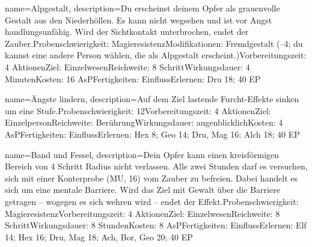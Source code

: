 {
    name={Alpgestalt},
    description={Du erscheinst deinem Opfer als grauenvolle Gestalt aus den Niederhöllen. Es kann nicht wegsehen und ist vor Angst handlungsunfähig. Wird der Sichtkontakt unterbrochen, endet der Zauber.\newline Probenschwierigkeit: Magieresistenz\newline Modifikationen: Fremdgestalt (–4; du kannst eine andere Person wählen, die als Alpgestalt erscheint.)\newline Vorbereitungszeit: 4 Aktionen\newline Ziel: Einzelwesen\newline Reichweite: 8 Schritt\newline Wirkungsdauer: 4 Minuten\newline Kosten: 16 AsP\newline Fertigkeiten: Einfluss\newline Erlernen: Dru 18; 40 EP}
}


{
    name={Ängste lindern},
    description={Auf dem Ziel lastende Furcht-Effekte sinken um eine Stufe.\newline Probenschwierigkeit: 12\newline Vorbereitungszeit: 4 Aktionen\newline Ziel: Einzelperson\newline Reichweite: Berührung\newline Wirkungsdauer: augenblicklich\newline Kosten: 4 AsP\newline Fertigkeiten: Einfluss\newline Erlernen: Hex 8; Geo 14; Dru, Mag 16; Alch 18; 40 EP}
}


{
    name={Band und Fessel},
    description={Dein Opfer kann einen kreisförmigen Bereich von 4 Schritt Radius nicht verlassen. Alle zwei Stunden darf es versuchen, sich mit einer Konterprobe (MU, 16) vom Zauber zu befreien. Dabei handelt es sich um eine mentale Barriere. Wird das Ziel mit Gewalt über die Barriere getragen – wogegen es sich wehren wird – endet der Effekt.\newline Probenschwierigkeit: Magieresistenz\newline Vorbereitungszeit: 4 Aktionen\newline Ziel: Einzelwesen\newline Reichweite: 8 Schritt\newline Wirkungsdauer: 8 Stunden\newline Kosten: 8 AsP\newline Fertigkeiten: Einfluss\newline Erlernen: Elf 14; Hex 16; Dru, Mag 18; Ach, Bor, Geo 20; 40 EP}
}


